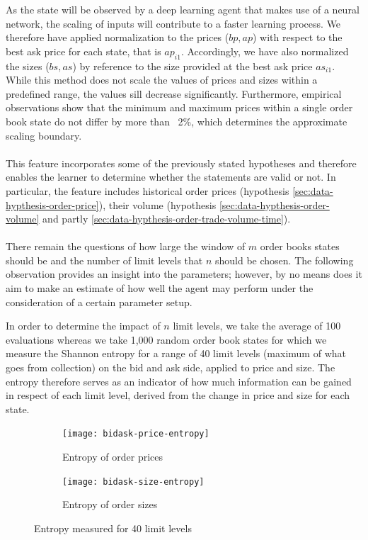 As the state will be observed by a deep learning agent that makes use of a neural network, the scaling of inputs will contribute to a faster learning process.
We therefore have applied normalization to the prices ($bp, ap$) with respect to the best ask price for each state, that is $ap_{i1}$.
Accordingly, we have also normalized the sizes ($bs, as$) by reference to the size provided at the best ask price $as_{i1}$.
While this method does not scale the values of prices and sizes within a predefined range, the values sill decrease significantly.
Furthermore, empirical observations show that the minimum and maximum prices within a single order book state do not differ by more than ~2\%, which determines the approximate scaling boundary.
\\
\\
This feature incorporates some of the previously stated hypotheses and therefore enables the learner to determine whether the statements are valid or not.
In particular, the feature includes historical order prices (hypothesis \ref{sec:data-hypthesis-order-price}), their volume (hypothesis \ref{sec:data-hypthesis-order-volume} and partly \ref{sec:data-hypthesis-order-trade-volume-time}).
\\
\\
There remain the questions of how large the window of $m$ order books states should be and the number of limit levels that $n$ should be chosen.
The following observation provides an insight into the parameters; however, by no means does it aim to make an estimate of how well the agent may perform under the consideration of a certain parameter setup.

In order to determine the impact of $n$ limit levels, we take the average of 100 evaluations whereas we take 1,000 random order book states for which we measure the Shannon entropy\cite{shannon2001mathematical} for a range of 40 limit levels (maximum of what goes from collection) on the bid and ask side, applied to price and size.
The entropy therefore serves as an indicator of how much information can be gained in respect of each limit level, derived from the change in price and size for each state.

\begin{figure}[H]
    \centering
    \begin{subfigure}[b]{0.45\textwidth}
        \texttt{[image: bidask-price-entropy]}
        \caption{Entropy of order prices}
        \label{fig:bidask-price-entropy}
    \end{subfigure}
    \begin{subfigure}[b]{0.45\textwidth}
        \texttt{[image: bidask-size-entropy]}
        \caption{Entropy of order sizes}
        \label{fig:bidask-size-entropy}
    \end{subfigure}
    \caption{Entropy measured for 40 limit levels}\label{fig:bidask-entropy}
\end{figure}

